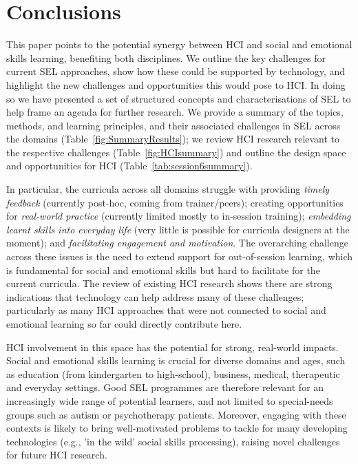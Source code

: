 \documentclass[prodmode,acmtochi]{acmsmall}
\begin{document}



\fi

\section{Conclusions}
\label{sec:conclusion}

This paper points to the potential synergy between HCI and social and emotional skills learning, benefiting both disciplines.
%
We outline the key challenges for current SEL approaches, show how these could be supported by technology, and highlight the new challenges and opportunities this would pose to HCI.
%
In doing so we have presented a set of structured concepts and characterisations of SEL to help frame an agenda for further research. We provide a summary of the topics, methods, and learning principles, and their associated challenges in SEL across the domains (Table~\ref{fig:SummaryResults}); we review HCI research relevant to the respective challenges (Table~\ref{fig:HCIsummary}) and outline the design space and opportunities for HCI  (Table~\ref{tab:session6summary}).

In particular, the curricula across all domains struggle with providing \emph{timely feedback} (currently post-hoc, coming from trainer/peers); creating opportunities for \emph{real-world practice} (currently limited mostly to in-session training); \emph{embedding learnt skills into everyday life} (very little is possible for curricula designers at the moment); and \emph{facilitating engagement and motivation}. The overarching challenge across these issues is the need to extend support for out-of-session learning, which is fundamental for social and emotional skills  but hard to facilitate for the current curricula.
%
The review of existing HCI research shows there are strong indications that technology can help address many of these challenges; particularly as many HCI approaches that were not connected to social and emotional learning so far could directly contribute here.

HCI involvement in this space has the potential for strong, real-world impacts.
%
Social and emotional skills learning is crucial for diverse domains and ages, such as education (from kindergarten to high-school), business, medical, therapeutic and everyday settings. Good SEL programmes are therefore relevant for an increasingly wide range of potential learners, and not limited to special-needs groups such as autism or psychotherapy patients.
%
Moreover, engaging with these contexts is likely to bring well-motivated problems to tackle for many developing technologies (e.g., 'in the wild' social skills processing), raising novel challenges for future HCI research.
\end{document}
